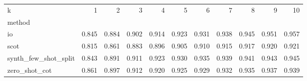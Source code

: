 \begin{tabular}{lrrrrrrrrrr}
\toprule
k & 1 & 2 & 3 & 4 & 5 & 6 & 7 & 8 & 9 & 10 \\
method &  &  &  &  &  &  &  &  &  &  \\
\midrule
io & 0.845 & 0.884 & 0.902 & 0.914 & 0.923 & 0.931 & 0.938 & 0.945 & 0.951 & 0.957 \\
scot & 0.815 & 0.861 & 0.883 & 0.896 & 0.905 & 0.910 & 0.915 & 0.917 & 0.920 & 0.921 \\
synth_few_shot_split & 0.843 & 0.891 & 0.911 & 0.923 & 0.930 & 0.935 & 0.939 & 0.941 & 0.943 & 0.945 \\
zero_shot_cot & 0.861 & 0.897 & 0.912 & 0.920 & 0.925 & 0.929 & 0.932 & 0.935 & 0.937 & 0.939 \\
\bottomrule
\end{tabular}

